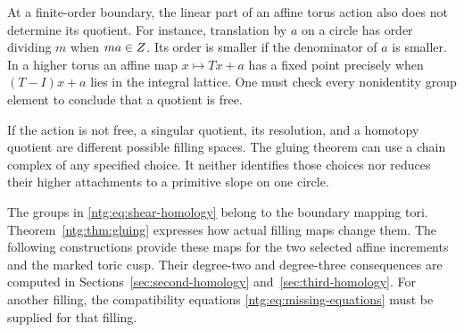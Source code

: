 At a finite-order boundary, the linear part of an affine torus action
also does not determine its quotient. For instance, translation by
$a$ on a circle has order dividing $m$ when $ma\in Z$. Its
order is smaller if the denominator of $a$ is smaller. In a higher
torus an affine map $x\mapsto Tx+a$ has a fixed point precisely
when $(T-I)x+a$ lies in the integral lattice. One must check every
nonidentity group element to conclude that a quotient is free.

If the action is not free, a singular quotient, its resolution, and
a homotopy quotient are different possible filling spaces. The gluing theorem can use a chain complex of any specified choice.
It neither identifies those choices nor reduces their higher attachments
to a primitive slope on one circle.

The groups in \eqref{ntg:eq:shear-homology} belong to the boundary
mapping tori. Theorem~\ref{ntg:thm:gluing} expresses how actual filling
maps change them. The following constructions provide these maps for
the two selected affine increments and the marked toric cusp. Their
degree-two and degree-three consequences are computed in
Sections~\ref{sec:second-homology} and~\ref{sec:third-homology}.
For another filling, the compatibility equations
\eqref{ntg:eq:missing-equations} must be supplied for that filling.

